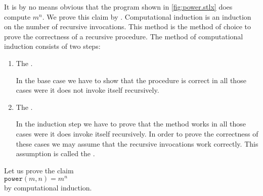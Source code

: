 It is by no means obvious that the program shown in \ref{fig:power.stlx} does compute
$m^n$.  We prove this claim by  .
Computational induction is an induction on the number of recursive invocations.
This method is the method of choice to prove the correctness of a recursive procedure.
The method of computational induction consists of two steps:
\begin{enumerate}
\item The .

      In the base case we have to show that the procedure is correct in all those cases were it
      does not invoke itself recursively.
\item The .

      In the induction step we have to prove that the method works in all those cases were
      it does invoke itself recursively.  In order to prove the correctness of these cases we may
      assume that the recursive invocations work correctly.  This assumption is called the
      .
\end{enumerate}
Let us prove the claim 
\\[0.2cm]
\hspace*{1.3cm}
 $\mathtt{power}(m,n) = m^n$
\\[0.2cm] 
by computational induction.
